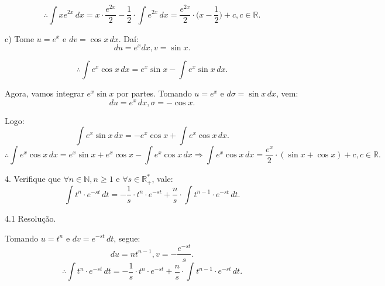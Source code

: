 \documentclass{article}
\begin{document}
{\begin{newpage}
$$\displaystyle{\therefore \int xe^{2x}\, dx = x\cdot\frac{e^{2x}}{2} - \frac{1}{2}\cdot\int e^{2x}\, dx = \frac{e^{2x}}{2}\cdot\Big( x - \frac{1}{2}\Big) + c, c\in\mathbb{R}.}$$
\par
\vspace{0.3cm}
c) Tome $u = e^{x}$ e $dv = \cos{x}\, dx$. Daí:
\begin{equation*}\displaystyle{du = e^{x}dx , v = \sin{x}.}\end{equation*}
\par
\begin{equation*} \displaystyle{\therefore \int e^{x}\cos{x}\, dx = e^{x}\sin{x} - \int e^{x}\sin{x}\, dx}.\end{equation*}
\par Agora, vamos integrar $e^{x}\sin{x}$ por partes. Tomando $u = e^{x}$ e $d\sigma = \sin{x}\, dx$, vem:
\begin{equation*} du = e^{x}\, dx , \sigma = -\cos{x} . \end{equation*}
\par Logo:
\begin{equation*}\displaystyle{\int e^{x}\sin{x}\, dx = -e^{x}\cos{x} + \int e^{x}\cos{x}\, dx}.\end{equation*}
$$\displaystyle{\therefore \int e^{x}\cos{x}\, dx = e^{x}\sin{x} + e^{x}\cos{x} - \int e^{x}\cos{x}\, dx \Rightarrow \int e^{x}\cos{x}\, dx = \frac{e^{x}}{2}\cdot (\sin{x} + \cos{x}) + c, c\in\mathbb{R}.}$$
\par
\vspace{0.3cm}
\begin{flushleft}
4. Verifique que $\forall n\in\mathbb{N}, n\geq 1$ e $\forall s\in\mathbb{R^{*}_{+}}$, vale:
\begin{equation*} \displaystyle{\int t^{n}\cdot e^{-st}\, dt = -\frac{1}{s}\cdot t^{n}\cdot e^{-st} + \frac{n}{s}\cdot\int t^{n-1}\cdot e^{-st}\, dt.}\end{equation*}
\end{flushleft}              
\par
\vspace{0.3cm}
\begin{flushleft}
4.1 Resolução.
\end{flushleft}
\par Tomando $u = t^{n}$ e $dv = e^{-st}\, dt$, segue:
\begin{equation*}\displaystyle{du = nt^{n-1} , v = -\frac{e^{-st}}{s}.}\end{equation*}
$$\displaystyle{\therefore \int t^{n}\cdot e^{-st}\, dt =  -\frac{1}{s}\cdot t^{n}\cdot e^{-st} + \frac{n}{s}\cdot\int t^{n-1}\cdot e^{-st}\, dt.}$$

\end{newpage}}
\end{document}
